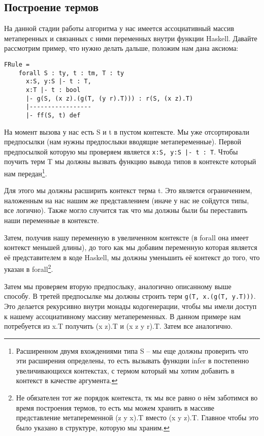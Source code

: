 \subsection{Построение термов}\label{build_exp}
На данной стадии работы алгоритма у нас имеется ассоциативный массив метаперенных и связанных с ними переменных внутри функции Haskell. Давайте рассмотрим пример, что нужно делать дальше, положим нам дана аксиома:
\begin{lstlisting}[caption={Исскуственное правило вывода для конструкции ff},captionpos=b, frame=single]
FRule =
    forall S : ty, t : tm, T : ty
      x:S, y:S |- t : T,
      x:T |- t : bool
      |- g(S, (x z).(g(T, (y r).T))) : r(S, (x z).T)
      |-----------------
      |- ff(S, t) def
\end{lstlisting}

На момент вызова у нас есть S и t в пустом контексте. Мы уже отсортировали предпосылки (нам нужны предпослыки вводящие метапеременные). Первой предпосылкой которую мы проверяем является \lstinline{x:S, y:S |- t : T}. Чтобы поучить терм T мы должны вызвать функцию вывода типов в контексте который нам передан\footnote{Расширенном двумя вхождениями типа S -- мы еще должны проверить что эти расширения определены, то есть вызывать функции infer в постепенно увеличивающихся контекстах, с термом который мы хотим добавить в контекст в качестве аргумента.}.

Для этого мы должны расширить контекст терма t. Это является ограничением, наложенным на нас нашим же представлением (иначе у нас не сойдутся типы, все логично). Также могло случится так что мы должны были бы переставить наши переменные в контексте.

Затем, получив нашу переменную в увеличенном контексте (в forall она имеет контекст меньшей длины), до того как мы добавим переменную которая является её представителем в коде Haskell, мы должны уменьшить её контекст до того, что указан в forall\footnote{Не обязателен тот же порядок контекста, тк мы все равно о нём заботимся во время построения термов, то есть мы можем хранить в массиве представление метапеременной (z y x).T вместо (x y z).T. Главное чтобы это было указано в структуре, которую мы храним.}.

Затем мы проверяем вторую предпослыку, аналогично описанному выше способу. В третей предпосылке мы должны строить терм \lstinline{g(T, x.(g(T, y.T)))}. Это делается рекурсивно внутри монады кодогенерации, чтобы мы имели доступ к нашему ассоциативному массиву метапеременных. В данном примере нам потребуется из x.T получить (x z).T и (x z y r).T. Затем все аналогично.

